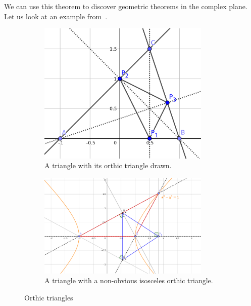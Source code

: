 We can use this theorem to discover geometric theorems in the complex plane. Let us look at an example from~\cite{MONTES20101391}.

\begin{figure}[t]
  \centering
  \begin{subfigure}{0.4\textwidth}
    \centering
    \includegraphics[width=0.9\textwidth]{geogebra_setup.png}
    \caption{A triangle with its orthic triangle drawn.}\label{fig:orthic_setup}
  \end{subfigure}%
  \begin{subfigure}{0.6\textwidth}
    \centering
    \includegraphics[width=0.9\textwidth]{geogebra_orthic.png}
    \caption{A triangle with a non-obvious isosceles orthic triangle.}\label{fig:orthic_solution}
  \end{subfigure}
  \caption{Orthic triangles}\label{fig:orthic}
\end{figure}

